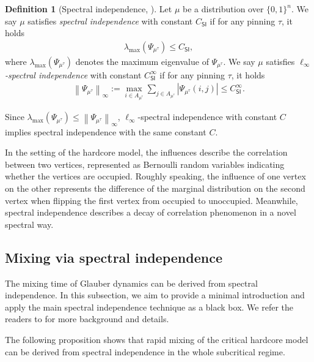\documentclass[11pt]{article}
\theoremstyle{plain}
\theoremstyle{definition}
\newtheorem{definition}[theorem]{Definition}
\theoremstyle{remark}
\newcommand{\norm}[1]{\left\lVert #1 \right\rVert}
\def\-#1{\mathrm{#1}} %
\newcommand{\SI}{\mathsf{SI}}
\begin{document}
\begin{definition}[Spectral independence, \cite{anari2020spectral}]
\label{def:SI}
	Let $\mu$ be a distribution over $\{0,1\}^n$.
	We say $\mu$ satisfies \emph{spectral independence} with constant $C_\SI$ if for any pinning $\tau$, it holds
	\begin{align*}
		\lambda_{\-{max}}(\Psi_{\mu^\tau}) \le C_\SI,
	\end{align*}
    where $\lambda_{\-{max}}(\Psi_{\mu^\tau})$ denotes the maximum eigenvalue of $\Psi_{\mu^\tau}$.
	We say $\mu$ satisfies \emph{$\ell_\infty$-spectral independence} with constant $C^\infty_\SI$ if for any pinning $\tau$, it holds
	\begin{align*}
		\norm{\Psi_{\mu^\tau}}_\infty := 
		\max_{i \in A_{\mu^\tau}} \sum_{j \in A_{\mu^\tau}} \left| \Psi_{\mu^\tau}(i,j) \right|
		\le C^\infty_\SI.
	\end{align*}
\end{definition}

Since $\lambda_{\-{max}}(\Psi_{\mu^\tau}) \le \norm{\Psi_{\mu^\tau}}_\infty$, $\ell_\infty$-spectral independence with constant $C$ implies spectral independence with the same constant $C$.  

In the setting of the hardcore model, the influences describe the correlation between two vertices, represented as Bernoulli random variables indicating whether the vertices are occupied.
Roughly speaking, the influence of one vertex on the other represents the difference of the marginal distribution on the second vertex when flipping the first vertex from occupied to unoccupied.
Meanwhile, spectral independence describes a decay of correlation phenomenon in a novel spectral way.

\subsection{Mixing via spectral independence}
\label{subsec:SI-mixing}

The mixing time of Glauber dynamics can be derived from spectral independence.
In this subsection, we aim to provide a minimal introduction and apply the main spectral independence technique as a black box.
We refer the readers to \cite{liu2023spectral,CCYZ24,chen2022localization} for more background and details.


The following proposition shows that rapid mixing of the critical hardcore model can be derived from spectral independence in the whole subcritical regime.
\end{document}
